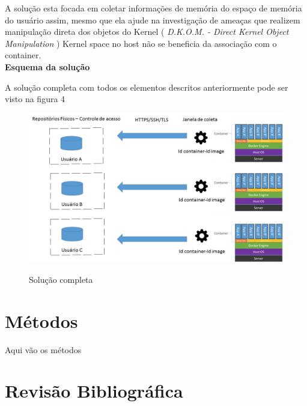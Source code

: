 \documentclass[
	12pt,				%
	openright,			%
	oneside,			%
	a4paper,			%
	english,			%
	french,				%
	spanish,			%
	brazil,				%
	]{abntex2}
\begin{document}
A solução esta focada em coletar informações de memória do espaço de memória do usuário assim, mesmo que ela ajude na investigação de ameaças que realizem manipulação direta
dos objetos do Kernel ( \textit{D.K.O.M. - Direct Kernel Object Manipulation} ) Kernel space no host não se beneficia da associação com o container.\\

\textbf{Esquema da solução}

A solução completa com todos os elementos descritos anteriormente pode ser visto na figura 4

\begin{figure}[h]
\caption{Solução completa}
\includegraphics[scale=0.5]{solucao.jpg}
\centering
\label{fig:Solucao}
\end{figure}

\chapter{Métodos}

Aqui vão os métodos

\chapter{Revisão Bibliográfica}
\end{document}
